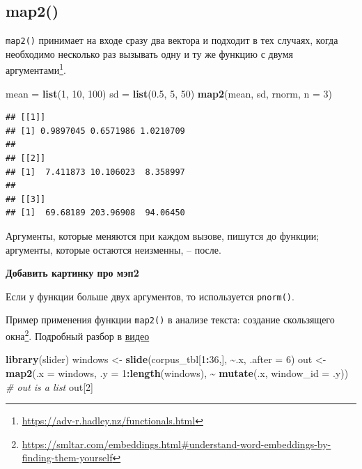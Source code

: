 \documentclass[
]{book}
\newenvironment{Shaded}{\begin{snugshade}}{\end{snugshade}}
\newcommand{\AttributeTok}[1]{\textcolor[rgb]{0.13,0.29,0.53}{#1}}
\newcommand{\CommentTok}[1]{\textcolor[rgb]{0.56,0.35,0.01}{\textit{#1}}}
\newcommand{\DecValTok}[1]{\textcolor[rgb]{0.00,0.00,0.81}{#1}}
\newcommand{\FloatTok}[1]{\textcolor[rgb]{0.00,0.00,0.81}{#1}}
\newcommand{\FunctionTok}[1]{\textcolor[rgb]{0.13,0.29,0.53}{\textbf{#1}}}
\newcommand{\NormalTok}[1]{#1}
\newcommand{\OtherTok}[1]{\textcolor[rgb]{0.56,0.35,0.01}{#1}}
\newcommand{\SpecialCharTok}[1]{\textcolor[rgb]{0.81,0.36,0.00}{\textbf{#1}}}
\theoremstyle{definition}
\theoremstyle{definition}
\theoremstyle{definition}
\theoremstyle{definition}
\theoremstyle{remark}
\begin{document}
\hypertarget{map2}{%
\subsection{map2()}\label{map2}}

\texttt{map2()} принимает на входе сразу два вектора и подходит в тех случаях, когда необходимо несколько раз вызывать одну и ту же функцию с двумя аргументами\footnote{\url{https://adv-r.hadley.nz/functionals.html}}.

\begin{Shaded}
\begin{Highlighting}[]
\NormalTok{mean }\OtherTok{=} \FunctionTok{list}\NormalTok{(}\DecValTok{1}\NormalTok{, }\DecValTok{10}\NormalTok{, }\DecValTok{100}\NormalTok{)}
\NormalTok{sd }\OtherTok{=} \FunctionTok{list}\NormalTok{(}\FloatTok{0.5}\NormalTok{, }\DecValTok{5}\NormalTok{, }\DecValTok{50}\NormalTok{)}
\FunctionTok{map2}\NormalTok{(mean, sd, rnorm, }\AttributeTok{n =} \DecValTok{3}\NormalTok{)}
\end{Highlighting}
\end{Shaded}

\begin{verbatim}
## [[1]]
## [1] 0.9897045 0.6571986 1.0210709
## 
## [[2]]
## [1]  7.411873 10.106023  8.358997
## 
## [[3]]
## [1]  69.68189 203.96908  94.06450
\end{verbatim}

Аргументы, которые меняются при каждом вызове, пишутся до функции; аргументы, которые остаются неизменны, -- после.

\textbf{Добавить картинку про мэп2}

Если у функции больше двух аргументов, то используется \texttt{pnorm()}.

Пример применения функции \texttt{map2()} в анализе текста: создание скользящего окна\footnote{\url{https://smltar.com/embeddings.html\#understand-word-embeddings-by-finding-them-yourself}}. Подробный разбор в \href{https://vk.com/video-211800158_456239215}{видео}

\begin{Shaded}
\begin{Highlighting}[]
\FunctionTok{library}\NormalTok{(slider)}
\NormalTok{windows }\OtherTok{\textless{}{-}} \FunctionTok{slide}\NormalTok{(corpus\_tbl[}\DecValTok{1}\SpecialCharTok{:}\DecValTok{36}\NormalTok{,], }\SpecialCharTok{\textasciitilde{}}\NormalTok{.x, }\AttributeTok{.after =} \DecValTok{6}\NormalTok{)}
\NormalTok{out }\OtherTok{\textless{}{-}} \FunctionTok{map2}\NormalTok{(}\AttributeTok{.x =}\NormalTok{ windows, }\AttributeTok{.y =} \DecValTok{1}\SpecialCharTok{:}\FunctionTok{length}\NormalTok{(windows), }\SpecialCharTok{\textasciitilde{}} \FunctionTok{mutate}\NormalTok{(.x, }\AttributeTok{window\_id =}\NormalTok{ .y)) }\CommentTok{\# out is a list}
\NormalTok{out[}\DecValTok{2}\NormalTok{]}
\end{Highlighting}
\end{Shaded}
\end{document}

